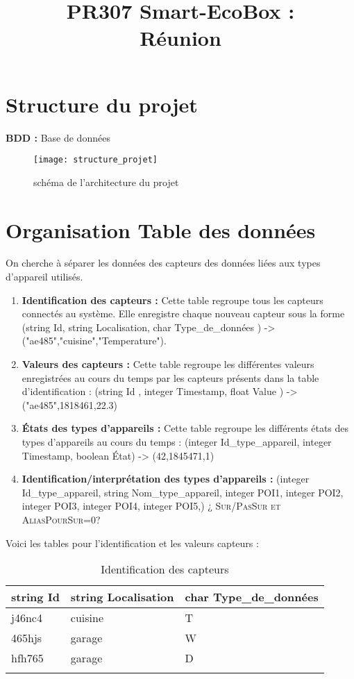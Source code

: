 \documentclass[10pt,a4paper]{article}
\title{PR307 Smart-EcoBox : \\ Réunion}
\begin{document}
\maketitle

\section {Structure du projet}
\textbf{BDD :} Base de données

\begin{figure}[h]
\centering
\texttt{[image: structure\_projet]}
\caption{schéma de l'architecture du projet}
\label{fig:my_label}
\end{figure}

\section{Organisation Table des données}

On cherche à séparer les données des capteurs des données liées aux types d'appareil utilisés.
\begin{enumerate}
\item \textbf{Identification des capteurs :} Cette table regroupe tous les capteurs connectés au système. Elle enregistre chaque nouveau capteur sous la forme (string Id, string Localisation, char Type\_de\_données ) -> ("ae485","cuisine","Temperature").
\item \textbf{Valeurs des capteurs :} Cette table regroupe les différentes valeurs enregistrées au cours 
du temps par les capteurs présents dans la table d'identification : (string Id , integer Timestamp, float Value ) -> ("ae485",1818461,22.3)
\item \textbf{États des types d'appareils : } Cette table regroupe les différents états des types d'appareils au cours du temps : (integer Id\_type\_appareil, integer Timestamp, boolean État) -> (42,1845471,1)
\item \textbf{Identification/interprétation des types d'appareils :} 
(integer Id\_type\_appareil, string Nom\_type\_appareil, integer POI1, integer POI2, integer POI3, integer POI4, integer POI5,) \textsc{¿ Sur/PasSur et AliasPourSur=0?}
\end{enumerate}
\newpage
Voici les tables pour l'identification et les valeurs capteurs :
\begin{table}[h!]
    \centering
    \begin{tabular}{|l|l|l|}
    \hline
    \rowcolor[HTML]{EFEFEF} 
    string Id & string Localisation & char Type\_de\_données \\ \hline
    j46nc4    & cuisine             & T                      \\ \hline
    465hjs    & garage              & W                      \\ \hline
    hfh765    & garage              & D                      \\ \hline
              &                     &                       
    \end{tabular}
    \caption{Identification des capteurs}
\end{table}
\end{document}
